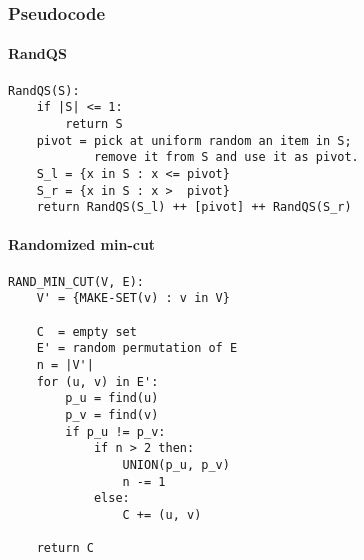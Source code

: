 \newpage
\subsubsection{Pseudocode}

\paragraph{RandQS}

\begin{verbatim}
RandQS(S):
    if |S| <= 1:
        return S
    pivot = pick at uniform random an item in S;
            remove it from S and use it as pivot.
    S_l = {x in S : x <= pivot}
    S_r = {x in S : x >  pivot}
    return RandQS(S_l) ++ [pivot] ++ RandQS(S_r)
\end{verbatim}

\paragraph{Randomized min-cut}

\begin{verbatim}
RAND_MIN_CUT(V, E):
    V' = {MAKE-SET(v) : v in V}

    C  = empty set
    E' = random permutation of E
    n = |V'|
    for (u, v) in E':
        p_u = find(u)
        p_v = find(v)
        if p_u != p_v:
            if n > 2 then:
                UNION(p_u, p_v)
                n -= 1
            else:
                C += (u, v)

    return C
\end{verbatim}
